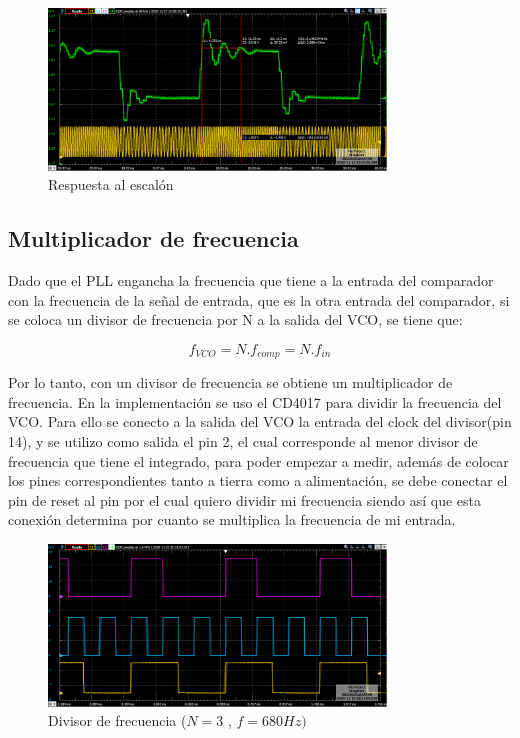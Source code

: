 \documentclass[10pt,a4paper]{article}
\begin{document}
\begin{figure}[H]
	\includegraphics[width= 0.8\textwidth]{../1. PLL/Imagenes/RespEscalonMedicion.png}
	\centering
	\caption{Respuesta al escalón}
	\label{fig:REspEscalon}
\end{figure}

\subsection{Multiplicador de frecuencia}
Dado que el PLL engancha la frecuencia que tiene a la entrada del comparador con la frecuencia de la señal de entrada, que es la otra entrada del comparador, si se coloca un divisor de frecuencia por N a la salida del VCO, se tiene que:

\begin{equation}
	f_{VCO} = N . f_{comp} = N . f_{in}
\end{equation}

Por lo tanto, con un divisor de frecuencia se obtiene un multiplicador de frecuencia. En la implementación se uso el CD4017 para dividir la frecuencia del VCO. Para ello se conecto a la salida del VCO la entrada del clock del divisor(pin 14), y se utilizo como salida el pin 2, el cual corresponde al menor divisor de frecuencia que tiene el integrado, para poder empezar a medir, además de colocar los pines correspondientes tanto a tierra como a alimentación, se debe conectar el pin de reset al pin por el cual quiero dividir mi frecuencia siendo así que esta conexión determina por cuanto se multiplica la frecuencia de mi entrada. 

\begin{figure}[H]
	\includegraphics[width= 0.8\textwidth]{../1. PLL/Imagenes/DIV3f680.png}
	\centering
	\caption{Divisor de frecuencia ($N=3$ , $f=680Hz)$}
	\label{fig:Div3Frec680}
\end{figure}
\end{document}
